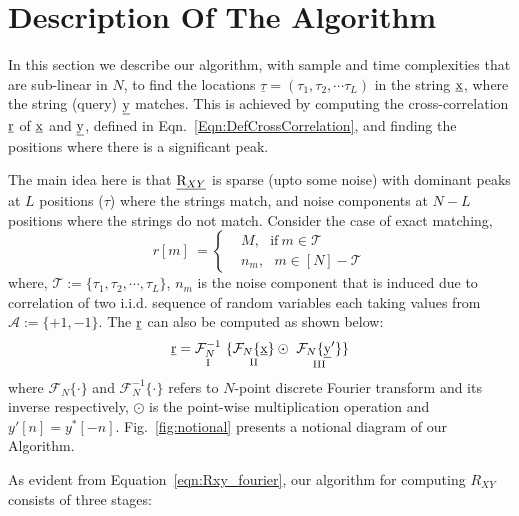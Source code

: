 \section{Description Of The Algorithm}
In this section we describe our algorithm, with sample and time complexities that are sub-linear in $N$, to find the locations $\underline{\tau} = (\tau_1, \tau_2, \cdots \tau_L)$ in the string $\underline{\mathrm{x}}$, where the string (query) $\underline{\mathrm{y}}$ matches. This is achieved by computing the cross-correlation $\underline{\mathrm{r}}$ of $\underline{\mathrm{x}}$ and $\underline{\mathrm{y}}$, defined in Eqn.~\eqref{Eqn:DefCrossCorrelation}, and finding the positions where there is a significant peak. 

The main idea here is that $\underline{\mathrm{R}_{XY}}$ is sparse (upto some noise) with dominant peaks at $L$ positions ($\tau$) where the strings match, and noise components at $N-L$ positions where the strings do not match. Consider the case of exact matching,
\begin{equation} \label{eqn:RXY_sparse}
r[m] \ = \left\{
\begin{array}{ll}
  &M , \ \ \  \text{if} \ m \in \mathcal{T} \\
  & n_m , \ \ \ m \in [N]-\mathcal{T}
\end{array} 
\right.  
\end{equation}
where, $ \mathcal{T}:=\{\tau_1, \tau_2, \cdots, \tau_L\}$,
 $n_m$ is the noise component that is induced due to correlation of two i.i.d. sequence of random variables each taking values from $\mathcal{A} := \{+1,-1\}$. The $\underline{\mathrm{r}}$ can also be computed as shown below:
\begin{equation}\label{eqn:Rxy_fourier}
  \rv = \underset{\text{ \RNum{1} } } {\mathcal{F}_{N}^{-1}} \ \{ \underset{\text{ \RNum{2} } }{  \mathcal{F}_{N}\{\xv\}}  \odot \ \underset{\text{ \RNum{3} } }{ \mathcal{F}_{N}\{\yv'\}}  \} 
\end{equation} 
where $\mathcal{F}_{N}\{ \cdot \}$ and $\mathcal{F}_{N}^{-1}\{ \cdot \}$ refers to $N$-point discrete Fourier transform and its inverse respectively, $\odot$ is the point-wise multiplication operation and ${ y'[n]} = { y^{*}[-n]}$. Fig.~\ref{fig:notional} presents a notional diagram of our Algorithm.

 As evident from Equation~\ref{eqn:Rxy_fourier}, our algorithm for computing $R_{XY}$ consists of three stages:


